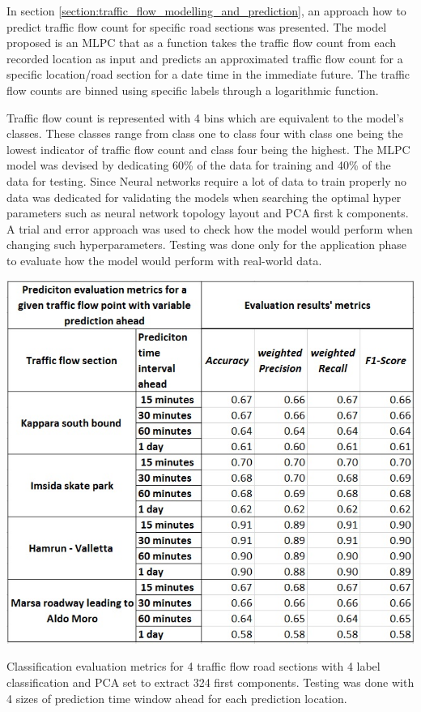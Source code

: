 \documentclass[12pt, a4paper]{report}
\theoremstyle{definition}
\theoremstyle{definition}%
\theoremstyle{definition}%
\theoremstyle{definition}%
\theoremstyle{definition}%
\theoremstyle{definition}%
\begin{document}
In section \ref{section:traffic_flow_modelling_and_prediction}, an approach how to predict traffic flow count for specific road sections was presented. The model proposed is an MLPC that as a function takes the traffic flow count from each recorded location as input and predicts an approximated traffic flow count for a specific location/road section for a date time in the immediate future. The traffic flow counts are binned using specific labels through a logarithmic function. 

Traffic flow count is represented with 4 bins which are equivalent to the model's classes. These classes range from class one to class four with class one being the lowest indicator of traffic flow count and class four being the highest. The MLPC model was devised by dedicating 60\% of the data for training and 40\% of the data for testing. Since Neural networks require a lot of data to train properly no data was dedicated for validating the models when searching the optimal hyper  parameters such as neural network topology layout and PCA first k components. A trial and error approach was used to check how the model would perform when changing such hyperparameters. Testing was done only for the application phase to evaluate how the model would perform with real-world data. 

\begin{table}[t!]	
	\includegraphics[scale=0.75]{classification_metrics_result.jpg}
	\centering
	\caption[Classification evaluation metrics for traffic flow prediction]{Classification evaluation metrics for 4 traffic flow road sections with 4 label classification and PCA set to extract 324 first components. Testing was done with 4 sizes of prediction time window ahead for each prediction location.}
	\label{table:classification_mertrics}
\end{table}
\end{document}
